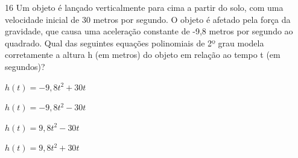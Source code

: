 



\num{16} Um objeto é lançado verticalmente para cima a partir do solo, com
uma velocidade inicial de 30 metros por segundo. O objeto é afetado pela
força da gravidade, que causa uma aceleração constante de -9,8 metros
por segundo ao quadrado. Qual das seguintes equações polinomiais de 2º
grau modela corretamente a altura h (em metros) do objeto em relação ao
tempo t (em segundos)?

\begin{escolha}
\item $h(t) = -9,8t^2 + 30t$
\item $h(t) = -9,8t^2 - 30t$
\item $h(t) = 9,8t^2 - 30t$
\item $h(t) = 9,8t^2 + 30t$
\end{escolha}





